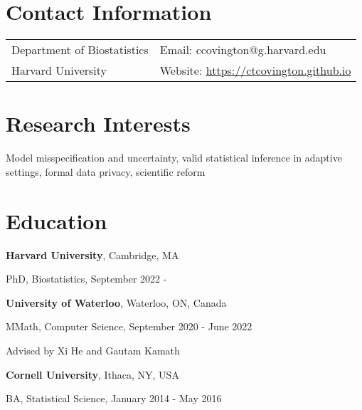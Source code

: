 \documentclass[margin,line]{res}
\newenvironment{list1}{
  \begin{list}{\ding{113}}{%
      \setlength{\itemsep}{0in}
      \setlength{\parsep}{0in} \setlength{\parskip}{0in}
      \setlength{\topsep}{0in} \setlength{\partopsep}{0in} 
      \setlength{\leftmargin}{0.17in}}}{\end{list}}
\begin{document}

\begin{resume}
\section{\sc Contact Information}
\vspace{.05in}
\begin{tabular}{@{}p{2in}p{4in}}
Department of Biostatistics  &  Email: ccovington@g.harvard.edu \\ %
Harvard University & Website: \href{https://ctcovington.github.io}{https://ctcovington.github.io} \\            
\end{tabular}


\section{\sc Research Interests}
Model misspecification and uncertainty, valid statistical inference in adaptive settings, 
formal data privacy, scientific reform 

\section{\sc Education}

{\bf Harvard University}, Cambridge, MA\\
\vspace*{-.1in}
\begin{list1}
\item[] PhD, Biostatistics,  September 2022 - 
\end{list1}

{\bf University of Waterloo}, Waterloo, ON, Canada\\
\vspace*{-.1in}
\begin{list1}
\item[] MMath, Computer Science,  September 2020 - June 2022
\item[] Advised by Xi He and Gautam Kamath 
\end{list1}

{\bf Cornell University}, Ithaca, NY, USA\\
\vspace*{-.1in}
\begin{list1}
\item[] BA, Statistical Science, January 2014 - May 2016 
\end{list1}


\end{resume}
\end{document}
